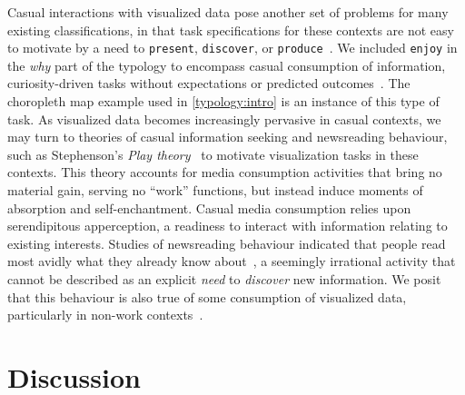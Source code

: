 Casual interactions with visualized data pose another set of problems for many existing classifications, in that task specifications for these contexts are not easy to motivate by a need to {\tt present}, {\tt discover}, or {\tt produce}~\cite{Sprague2012}.
We included {\tt enjoy} in the {\it why} part of the typology to encompass casual consumption of information, curiosity-driven tasks without expectations or predicted outcomes~\cite{Dork2011,Toms2000}.
The choropleth map example used in \autoref{typology:intro} is an instance of this type of task.
As visualized data becomes increasingly pervasive in casual contexts, we may turn to theories of casual information seeking and newsreading behaviour, such as Stephenson's {\it Play theory}~\cite{Stephenson1967} to motivate visualization tasks in these contexts.
This theory accounts for media consumption activities that bring no material gain, serving no ``work'' functions, but instead induce moments of absorption and self-enchantment.
Casual media consumption relies upon serendipitous apperception, a readiness to interact with information relating to existing interests.
Studies of newsreading behaviour indicated that people read most avidly what they already know about~\cite{Stephenson1967}, a seemingly irrational activity that cannot be described as an explicit {\it need} to {\it discover} new information.
We posit that this behaviour is also true of some consumption of visualized data, particularly in non-work contexts~\cite{Pousman2007,Sprague2012}.


\section{Discussion}
\label{typology:discussion}



